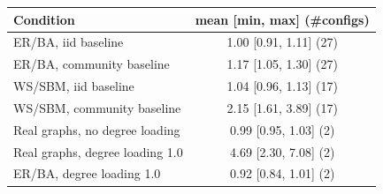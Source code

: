 \begin{tabular}{lc}
\toprule
Condition & mean [min, max] (\#configs) \\
\midrule
ER/BA, iid baseline & 1.00 [0.91, 1.11] (27) \\
ER/BA, community baseline & 1.17 [1.05, 1.30] (27) \\
WS/SBM, iid baseline & 1.04 [0.96, 1.13] (17) \\
WS/SBM, community baseline & 2.15 [1.61, 3.89] (17) \\
Real graphs, no degree loading & 0.99 [0.95, 1.03] (2) \\
Real graphs, degree loading 1.0 & 4.69 [2.30, 7.08] (2) \\
ER/BA, degree loading 1.0 & 0.92 [0.84, 1.01] (2) \\
\bottomrule
\end{tabular}
